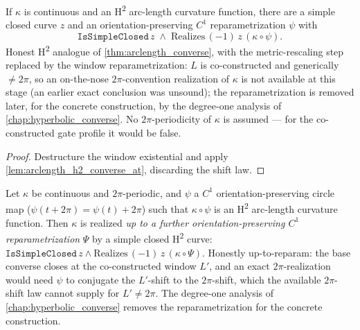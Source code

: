 \begin{theorem}
  \label{thm:arclength_h2_converse}
  If $\kappa$ is continuous and an H\textsuperscript{2} arc-length curvature
  function, there are a simple closed curve $z$ and an orientation-preserving
  $C^1$ reparametrization $\psi$ with
  \[
    \texttt{IsSimpleClosed}\,z \;\wedge\;
    \mathrm{Realizes}\,(-1)\,z\,(\kappa\circ\psi).
  \]
  Honest H\textsuperscript{2} analogue of \cref{thm:arclength_converse}, with
  the metric-rescaling step replaced by the window reparametrization: $L$ is
  co-constructed and generically $\ne2\pi$, so an on-the-nose $2\pi$-convention
  realization of $\kappa$ is not available at this stage (an earlier exact
  conclusion was unsound); the reparametrization is removed later, for the
  concrete construction, by the degree-one analysis of
  \cref{chap:hyperbolic_converse}. No $2\pi$-periodicity of $\kappa$ is
  assumed — for the co-constructed gate profile it would be false.
\end{theorem}

\begin{proof}
  \leanok
  Destructure the window existential and apply
  \cref{lem:arclength_h2_converse_at}, discarding the shift law.
\end{proof}

\begin{lemma}
  \label{lem:realizes_h2_of_reparam}
  Let $\kappa$ be continuous and $2\pi$-periodic, and $\psi$ a $C^1$
  orientation-preserving circle map ($\psi(t+2\pi)=\psi(t)+2\pi$) such that
  $\kappa\circ\psi$ is an H\textsuperscript{2} arc-length curvature function.
  Then $\kappa$ is realized \emph{up to a further orientation-preserving $C^1$
  reparametrization} $\Psi$ by a simple closed H\textsuperscript{2} curve:
  $\texttt{IsSimpleClosed}\,z\wedge\mathrm{Realizes}\,(-1)\,z\,(\kappa\circ\Psi)$.
  Honestly up-to-reparam: the base converse closes at the co-constructed window
  $L'$, and an exact $2\pi$-realization would need $\psi$ to conjugate the
  $L'$-shift to the $2\pi$-shift, which the available $2\pi$-shift law cannot
  supply for $L'\ne2\pi$. The degree-one analysis of
  \cref{chap:hyperbolic_converse} removes the reparametrization for the
  concrete construction.
\end{lemma}

